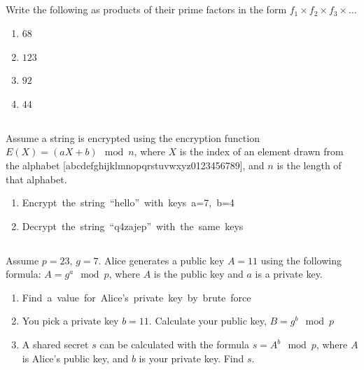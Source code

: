 \documentclass[twocolumn]{article}
\newcommand\mrk[1]{}
\begin{document}
\subsection{}

    Write the following as products of their prime factors in the form $ f_1 \times f_2 \times f_3 \times \dots $

    \begin{multicols}{2}
        \begin{enumerate}
            \item $68$ \mrk{1}
            \item $123$ \mrk{1}
            \item $92$ \mrk{1}
            \item $44$ \mrk{1}
        \end{enumerate}
    \end{multicols}

\subsection{}

    Assume a string is encrypted using the encryption function $E(X) = (aX + b) \mod n$, where $X$ is the index of an element drawn from the alphabet [abcdefghijklmnopqrstuvwxyz0123456789], and $n$ is the length of that alphabet.

    \begin{enumerate}
        \item \mbox{Encrypt the string ``hello'' with keys a=7, b=4 \mrk{1}}
        \item \mbox{Decrypt the string ``q4zajep'' with the same keys \mrk{1}}
    \end{enumerate}

\subsection{}

    Assume $p = 23$, $g = 7$. Alice generates a public key $A = 11$ using the following formula: $A = g^a \mod p$, where $A$ is the public key and $a$ is a private key.

    \begin{enumerate}
        \item \mbox{Find a value for Alice’s private key by brute force \mrk{1}}
        \item You pick a private key $b = 11$. Calculate your public key, $B = g^b \mod p$ \mrk{1}
        \item A shared secret $s$ can be calculated with the formula $s = A^b \mod p$, where $A$ is Alice’s public key, and $b$ is your private key. Find $s$. \mrk{1}
    \end{enumerate}
\end{document}

